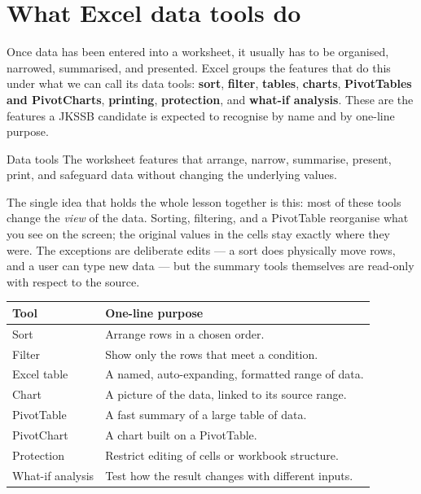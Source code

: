 \section{What Excel data tools do}
Once data has been entered into a worksheet, it usually has to be organised,
narrowed, summarised, and presented. Excel groups the features that do this
under what we can call its data tools: \textbf{sort}, \textbf{filter},
\textbf{tables}, \textbf{charts}, \textbf{PivotTables and PivotCharts},
\textbf{printing}, \textbf{protection}, and \textbf{what-if analysis}. These are
the features a JKSSB candidate is expected to recognise by name and by
one-line purpose.

\begin{definitionbox}{Data tools}
The worksheet features that arrange, narrow, summarise, present, print, and
safeguard data without changing the underlying values.
\end{definitionbox}

The single idea that holds the whole lesson together is this: most of these
tools change the \emph{view} of the data. Sorting, filtering, and a PivotTable
reorganise what you see on the screen; the original values in the cells stay
exactly where they were. The exceptions are deliberate edits --- a sort does
physically move rows, and a user can type new data --- but the summary tools
themselves are read-only with respect to the source.

\begin{center}
\begin{tabular}{p{}p{}}
\toprule
\textbf{Tool} & \textbf{One-line purpose} \\
\midrule
Sort & Arrange rows in a chosen order. \\
Filter & Show only the rows that meet a condition. \\
Excel table & A named, auto-expanding, formatted range of data. \\
Chart & A picture of the data, linked to its source range. \\
PivotTable & A fast summary of a large table of data. \\
PivotChart & A chart built on a PivotTable. \\
Protection & Restrict editing of cells or workbook structure. \\
What-if analysis & Test how the result changes with different inputs. \\
\bottomrule
\end{tabular}
\end{center}

